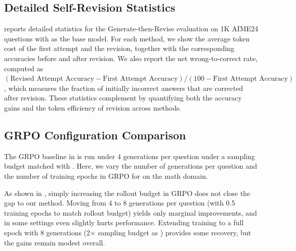 \subsection{Detailed Self-Revision Statistics}
\label{app:revision-token-tradeoff}

 reports detailed statistics for the Generate-then-Revise evaluation on 1K AIME24 questions with \qwen{} as the base model. For each method, we show the average token cost of the first attempt and the revision, together with the corresponding accuracies before and after revision. We also report the net wrong-to-correct rate, computed as $(\text{Revised Attempt Accuracy} - \text{First Attempt Accuracy}) / (100 - \text{First Attempt Accuracy})$, which measures the fraction of initially incorrect answers that are corrected after revision. These statistics complement  by quantifying both the accuracy gains and the token efficiency of revision across methods.
\vspace{-1em}


\subsection{GRPO Configuration Comparison}
The GRPO baseline in  is run under 4 generations per question under a sampling budget matched with \ours{}. Here, we vary the number of generations per question and the number of training epochs in GRPO for \qwen{} on the math domain.

As shown in , simply increasing the rollout budget in GRPO does not close the gap to our method. Moving from 4 to 8 generations per question (with 0.5 training epochs to match rollout budget) yields only marginal improvements, and in some settings even slightly hurts performance. Extending training to a full epoch with 8 generations (2$\times$ sampling budget as \ours{}) provides some recovery, but the gains remain modest overall.




